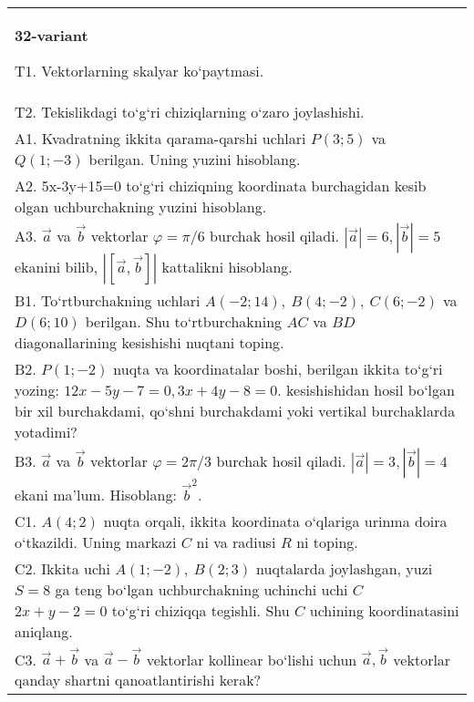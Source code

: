 \documentclass{article}
\begin{document}
\begin{tabular}{m{17cm}}
\textbf{32-variant}
\newline

T1. 
Vektorlarning skalyar ko‘paytmasi.
 \\
T2. 
Tekislikdagi to‘g‘ri chiziqlarning o‘zaro joylashishi.
 \\
A1. 
Kvadratning ikkita qarama-qarshi uchlari $P (3; 5) $ va
$Q (1; -3) $ berilgan. Uning yuzini hisoblang.
 \\
A2. 
5x-3y+15=0 to‘g‘ri chiziqning koordinata burchagidan
kesib olgan uchburchakning yuzini hisoblang.
 \\
A3. 
$\overrightarrow{a}$ va $\overrightarrow{b}$ vektorlar
$\varphi = \pi/6$ burchak hosil qiladi.
$|\overrightarrow{a}| = 6,|\overrightarrow{b}| = 5$ ekanini bilib,
$\left| \left\lbrack \overrightarrow{a},\overrightarrow{b} \right\rbrack \right|$ kattalikni hisoblang.
 \\
B1. 
To‘rtburchakning uchlari
\(A (-2;14),\ B (4;-2),\ C (6;-2) \) va \(D (6;10) \) berilgan. Shu
to‘rtburchakning $AC$ va $BD$ diagonallarining kesishishi
nuqtani toping.
 \\
B2. 
\(P (1;-2) \) nuqta va koordinatalar boshi, berilgan ikkita
to‘g‘ri yozing: $12x-5y-7=0, 3x+4y-8=0$.
kesishishidan hosil bo‘lgan bir xil burchakdami, qo‘shni burchakdami yoki vertikal
burchaklarda yotadimi?
 \\
B3. 
$\vec{a}$ va $\vec{b}$ vektorlar $\varphi = 2\pi/3$ burchak hosil qiladi. $|\vec{a}| = 3,|\vec{b}| = 4$ ekani ma’lum. Hisoblang:
${\vec{b}}^{2}$.
 \\
C1. \(A (4;2) \) nuqta orqali, ikkita koordinata o‘qlariga
urinma doira o‘tkazildi. Uning markazi $C$ ni va radiusi
$R$ ni toping.
 \\
C2. Ikkita uchi \(A (1; - 2),\ B (2;3) \) nuqtalarda joylashgan,
yuzi \(S = 8\) ga teng bo‘lgan uchburchakning uchinchi uchi
$C$ \(2x + y - 2 = 0\) to‘g‘ri chiziqqa tegishli. Shu $C$ uchining
koordinatasini aniqlang.
 \\
C3. 
\(\vec{a}+\vec{b}\) va \(\vec{a} - \vec{b}\) vektorlar kollinear bo‘lishi uchun \(\vec{a},\vec{b}\) vektorlar qanday shartni qanoatlantirishi kerak?
 \\

\end{tabular}
\vspace{1cm}
\end{document}
